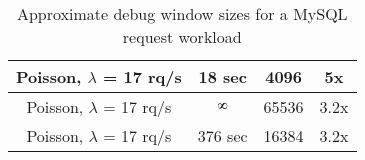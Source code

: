 \begin{table}[ht]
\begin{centering}
\begin{tabular}{|c|c|c|c|}
Poisson, $\lambda$ = 17 rq/s                               & 18 sec                                                 & 4096                                                & 5x                      \\ \hline
Poisson, $\lambda$ = 17 rq/s                               & $\infinity$                                                    & 65536                                               & 3.2x \\ \hline
Poisson, $\lambda$ = 17 rq/s                               & 376 sec                                                & 16384                                               & 3.2x \\ \hline
\end{tabular}
\captionsetup{justification=centering}
\caption{Approximate debug window sizes for a MySQL request workload}
\label{table:timewindow}
\end{centering}
\end{table}
\fi


 

